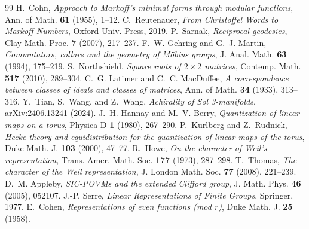 \documentclass[11pt]{article}
\theoremstyle{plain}
\theoremstyle{definition}
\theoremstyle{remark}
\begin{document}
\begin{thebibliography}{99}
 H.~Cohn, \emph{Approach to Markoff's minimal forms through modular functions}, Ann. of Math. \textbf{61} (1955), 1--12.
 C.~Reutenauer, \emph{From Christoffel Words to Markoff Numbers}, Oxford Univ. Press, 2019.
 P.~Sarnak, \emph{Reciprocal geodesics}, Clay Math. Proc. \textbf{7} (2007), 217--237.
 F.~W. Gehring and G.~J. Martin, \emph{Commutators, collars and the geometry of M\"obius groups}, J. Anal. Math. \textbf{63} (1994), 175--219.
 S.~Northshield, \emph{Square roots of $2\times2$ matrices}, Contemp. Math. \textbf{517} (2010), 289--304.
 C.~G. Latimer and C.~C. MacDuffee, \emph{A correspondence between classes of ideals and classes of matrices}, Ann. of Math. \textbf{34} (1933), 313--316.
 Y.~Tian, S.~Wang, and Z.~Wang, \emph{Achirality of Sol 3-manifolds}, arXiv:2406.13241 (2024).
 J.~H. Hannay and M.~V. Berry, \emph{Quantization of linear maps on a torus}, Physica D \textbf{1} (1980), 267--290.
 P.~Kurlberg and Z.~Rudnick, \emph{Hecke theory and equidistribution for the quantization of linear maps of the torus}, Duke Math. J. \textbf{103} (2000), 47--77.
 R.~Howe, \emph{On the character of Weil's representation}, Trans. Amer. Math. Soc. \textbf{177} (1973), 287--298.
 T.~Thomas, \emph{The character of the Weil representation}, J. London Math. Soc. \textbf{77} (2008), 221--239.
 D.~M. Appleby, \emph{SIC-POVMs and the extended Clifford group}, J. Math. Phys. \textbf{46} (2005), 052107.
 J.-P. Serre, \emph{Linear Representations of Finite Groups}, Springer, 1977.
 E.~Cohen, \emph{Representations of even functions (mod $r$)}, Duke Math. J. \textbf{25} (1958).
\end{thebibliography}
\end{document}
